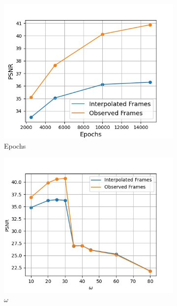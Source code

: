 \documentclass{article}
\begin{document}
\begin{figure}[h]
\begin{subfigure}{0.31\textwidth}
	\centering
    \includegraphics[width=1\linewidth]{Epochs.jpg}
    \caption{Epochs}
\end{subfigure}

\begin{subfigure}{0.3\textwidth}
\centering
    \includegraphics[width=1\linewidth]{omega.jpg}
    \caption{$\omega$}
    \label{fig_abl_omega}
\end{subfigure}%
\begin{subfigure}{0.3\textwidth}
\centering


\end{subfigure}
\end{figure}
\end{document}
